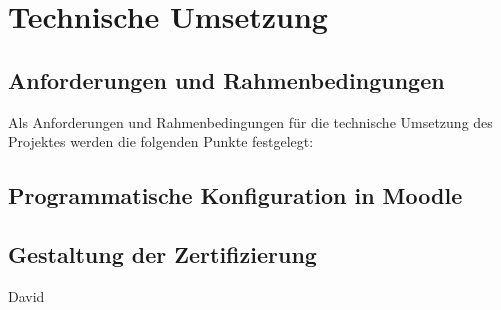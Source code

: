 \chapter{Technische Umsetzung}
\section{Anforderungen und Rahmenbedingungen}
Als Anforderungen und Rahmenbedingungen für die technische Umsetzung des Projektes
werden die folgenden Punkte festgelegt:
\section{Programmatische Konfiguration in Moodle}
\section{Gestaltung der Zertifizierung}
David



